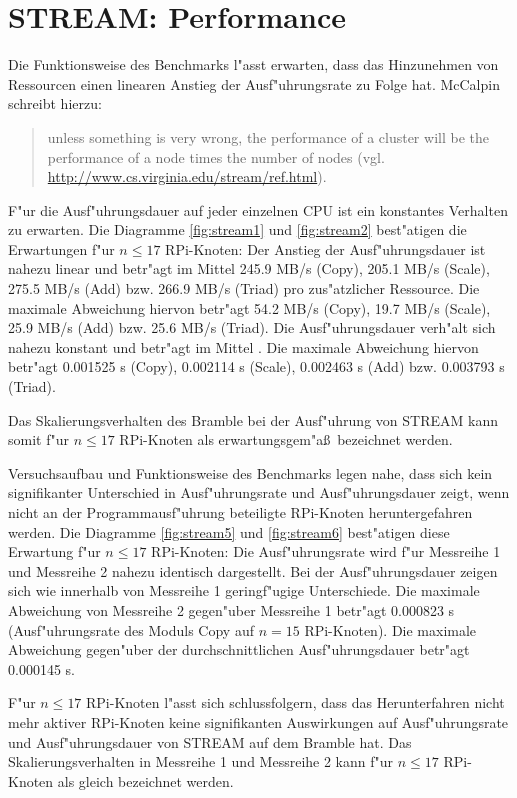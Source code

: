 \section{STREAM: Performance}\label{Interpretation-Stream}

Die Funktionsweise des Benchmarks l"asst erwarten, dass das Hinzunehmen von Ressourcen einen linearen Anstieg der Ausf"uhrungsrate zu Folge hat. McCalpin schreibt hierzu: 
\begin{quote}
\onehalfspacing
[\dots] unless something is very wrong, the performance of a cluster will be the performance of a node times the number of nodes (vgl. \url{http://www.cs.virginia.edu/stream/ref.html}).
\end{quote}
F"ur die Ausf"uhrungsdauer auf jeder einzelnen CPU ist ein konstantes Verhalten zu erwarten. Die Diagramme \ref{fig:stream1} und \ref{fig:stream2} best"atigen die Erwartungen f"ur $n\leq 17$ RPi-Knoten: Der Anstieg der Ausf"uhrungsdauer ist nahezu linear und betr"agt im Mittel 245.9 MB/s (Copy), 205.1 MB/s (Scale), 275.5 MB/s (Add) bzw. 266.9 MB/s (Triad) pro zus"atzlicher Ressource. Die maximale Abweichung hiervon betr"agt 54.2 MB/s (Copy), 19.7 MB/s (Scale), 25.9 MB/s (Add) bzw. 25.6 MB/s (Triad). Die Ausf"uhrungsdauer verh"alt sich nahezu konstant und betr"agt im Mittel %
. Die maximale Abweichung hiervon betr"agt 0.001525 s (Copy), 0.002114 s (Scale), 0.002463 s (Add) bzw. 0.003793 s (Triad). 

Das Skalierungsverhalten des Bramble bei der Ausf"uhrung von STREAM kann somit f"ur $n\leq 17$ RPi-Knoten als erwartungsgem"a\ss\ bezeichnet werden. 

Versuchsaufbau und Funktionsweise des Benchmarks legen nahe, dass sich kein signifikanter Unterschied in Ausf"uhrungsrate und Ausf"uhrungsdauer zeigt, wenn nicht an der Programmausf"uhrung beteiligte RPi-Knoten heruntergefahren werden. Die Diagramme \ref{fig:stream5} und \ref{fig:stream6} best"atigen diese Erwartung f"ur $n\leq 17$ RPi-Knoten: Die Ausf"uhrungsrate wird f"ur Messreihe 1 und Messreihe 2 nahezu identisch dargestellt. Bei der Ausf"uhrungsdauer zeigen sich wie innerhalb von Messreihe 1 geringf"ugige Unterschiede. Die maximale Abweichung von Messreihe 2 gegen"uber Messreihe 1 betr"agt 0.000823 s (Ausf"uhrungsrate des Moduls Copy auf $n=15$ RPi-Knoten). Die maximale Abweichung gegen"uber der durchschnittlichen Ausf"uhrungsdauer betr"agt %
0.000145 s.

F"ur $n\leq 17$ RPi-Knoten l"asst sich schlussfolgern, dass das Herunterfahren nicht mehr aktiver RPi-Knoten keine signifikanten Auswirkungen auf Ausf"uhrungsrate und Ausf"uhrungsdauer von STREAM auf dem Bramble hat. Das Skalierungsverhalten in Messreihe 1 und Messreihe 2 kann f"ur $n\leq 17$ RPi-Knoten als gleich bezeichnet werden.

